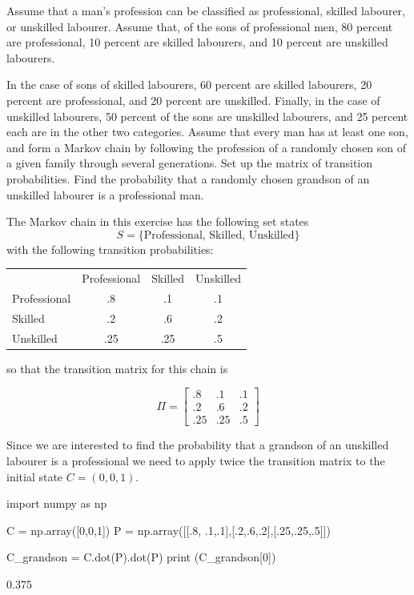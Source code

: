 \begin{question}
Assume that a man’s profession can be classified as professional, skilled labourer, or unskilled labourer. Assume that, of the sons of professional men, 80 percent are professional, 10 percent are skilled labourers, and 10 percent are unskilled labourers.

In the case of sons of skilled labourers, 60 percent are skilled labourers, 20 percent are professional, and 20 percent are unskilled. Finally, in the case of unskilled labourers, 50 percent of the sons are unskilled labourers, and 25 percent each are in the other two categories. Assume that every man has at least one son, and form a Markov chain by following the profession of a randomly chosen son of a given family through several generations. Set up the matrix of transition probabilities. Find the probability that a randomly chosen grandson of an unskilled labourer is a professional man.
\end{question}

\cprotEnv\begin{solution}
The Markov chain in this exercise has the following set states
\begin{equation*}
S = \{\textrm{Professional, Skilled, Unskilled}\}
\end{equation*}
with the following transition probabilities:

\begin{table}[htbp]
\centering
\begin{tabular}{l c c c}
&Professional& Skilled &Unskilled \\
Professional & .8 & .1 & .1 \\
Skilled & .2 & .6 & .2 \\
Unskilled & .25 & .25 & .5 \\
\end{tabular}
\end{table}
\noindent
so that the transition matrix for this chain is

\begin{equation*}
\Pi =
\begin{bmatrix}
.8 &.1 &.1\\
.2 &.6 &.2\\
.25 &.25 &.5
\end{bmatrix}
\end{equation*}

Since we are interested to find the probability that a grandson of an unskilled labourer is a professional we need to apply twice the transition matrix to the initial state $C=(0, 0, 1)$.
\begin{ipython}
import numpy as np

C = np.array([0,0,1])
P = np.array([[.8, .1,.1],[.2,.6,.2],[.25,.25,.5]])

C_grandson = C.dot(P).dot(P)
print (C_grandson[0])
\end{ipython}
\begin{ioutput}
0.375
\end{ioutput}
\end{solution}

